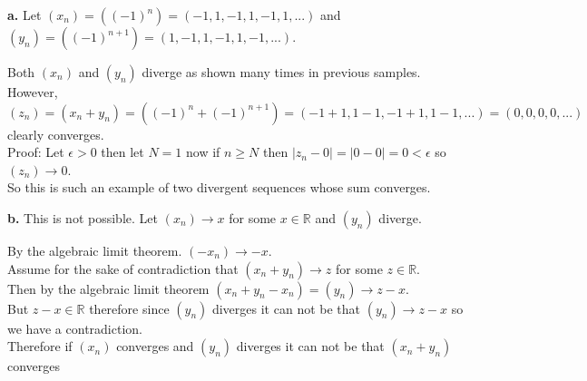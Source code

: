 \documentclass{article}
\begin{document}
{\Large \textbf{a.}} Let $(x_n) = ((-1)^n) = (-1, 1, -1, 1, -1, 1, ...)$ and $(y_n) = ((-1)^{n+1}) = (1, -1, 1, -1, 1, -1, ...)$.
\begin{center}
    \doublespacing
    Both $(x_n)$ and $(y_n)$ diverge as shown many times in previous samples.
    \\However, $(z_n) = (x_n + y_n) = ((-1)^n + (-1)^{n+1}) = (-1 + 1, 1 - 1, -1 + 1, 1 - 1, ...) = (0, 0, 0, 0, ...)$ clearly converges.
    \\Proof: Let $\epsilon > 0$ then let $N = 1$ now if $n\geq N$ then $|z_n - 0| = |0 - 0| = 0 <\epsilon$ so $(z_n)\rightarrow 0$.
    \\So this is such an example of two divergent sequences whose sum converges.
\end{center}

{\Large \textbf{b.}} This is not possible. Let $(x_n)\rightarrow x$ for some $x\in\mathbb{R}$ and $(y_n)$ diverge.
\begin{center}
    \doublespacing
    By the algebraic limit theorem. $(-x_n)\rightarrow -x$.
    \\Assume for the sake of contradiction that $(x_n + y_n)\rightarrow z$ for some $z\in\mathbb{R}$.
    \\Then by the algebraic limit theorem $(x_n + y_n - x_n) = (y_n)\rightarrow z - x$.
    \\But $z - x\in\mathbb{R}$ therefore since $(y_n)$ diverges it can not be that $(y_n)\rightarrow z - x$ so we have a contradiction.
    \\Therefore if $(x_n)$ converges and $(y_n)$ diverges it can not be that $(x_n + y_n)$ converges \qedsymbol
\end{center}
\end{document}
